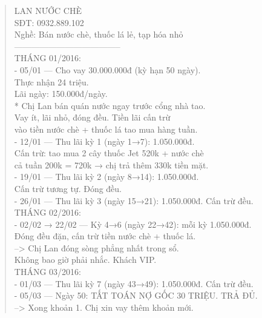 \documentclass[12pt,a4paper]{article}
\begin{document}
\begin{quote}
\fontsize{9pt}{11pt}\selectfont\ttfamily
LAN NƯỚC CHÈ\\
SĐT: 0932.889.102\\
Nghề: Bán nước chè, thuốc lá lẻ, tạp hóa nhỏ\\
--------------------------------------\\
\vspace{0.2cm}
THÁNG 01/2016:\\
- 05/01 --- Cho vay 30.000.000đ (kỳ hạn 50 ngày).\\
          Thực nhận 24 triệu.\\
          Lãi ngày: 150.000đ/ngày.\\
          * Chị Lan bán quán nước ngay trước cổng nhà tao.\\
            Vay ít, lãi nhỏ, đóng đều. Tiền lãi cấn trừ\\
            vào tiền nước chè + thuốc lá tao mua hàng tuần.\\
\vspace{0.2cm}
- 12/01 --- Thu lãi kỳ 1 (ngày 1→7): 1.050.000đ.\\
          Cấn trừ: tao mua 2 cây thuốc Jet 520k + nước chè\\
          cả tuần 200k = 720k → chị trả thêm 330k tiền mặt.\\
- 19/01 --- Thu lãi kỳ 2 (ngày 8→14): 1.050.000đ.\\
          Cấn trừ tương tự. Đóng đều.\\
- 26/01 --- Thu lãi kỳ 3 (ngày 15→21): 1.050.000đ. Cấn trừ đều.\\
\vspace{0.2cm}
THÁNG 02/2016:\\
- 02/02 → 22/02 --- Kỳ 4→6 (ngày 22→42): mỗi kỳ 1.050.000đ.\\
          Đóng đều đặn, cấn trừ tiền nước chè + thuốc lá.\\
          --> Chị Lan đóng sòng phẳng nhất trong sổ.\\
              Không bao giờ phải nhắc. Khách VIP.\\
\vspace{0.2cm}
THÁNG 03/2016:\\
- 01/03 --- Thu lãi kỳ 7 (ngày 43→49): 1.050.000đ. Cấn trừ đều.\\
- 05/03 --- Ngày 50: TẤT TOÁN NỢ GỐC 30 TRIỆU. TRẢ ĐỦ.\\
          --> Xong khoản 1. Chị xin vay thêm khoản mới.\\
\vspace{0.2cm}

\end{quote}
\end{document}
